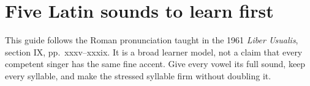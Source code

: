 \newcommand{\PrintServerAnswer}[1]{%
  \begin{serverlessonunit}
  \begin{serverlessonbox}{\ServerTitleData{#1}}
  \small
  {\scriptsize\bfseries YOUR JOB}\quad \ServerJobData{#1}\par
  {\scriptsize\bfseries HEAR}\quad
  \SpokenCue{\ServerCueData{#1}}\par
  {\scriptsize\bfseries RESPONSE}\quad
  {\large\CanonLatin{\SpokenResponse{\ServerLatinData{#1}}}}\par
  {\scriptsize\bfseries LATIN CHUNKS}\quad
  {\footnotesize\ServerLearnerLine{\ServerLearnerData{#1}}}\par
  {\scriptsize\bfseries SAY IT LIKE}\quad
  \SoundLine{\ServerSoundData{#1}}\par
  {\scriptsize\bfseries MEANING}\quad \ServerMeaningData{#1}\par
  \end{serverlessonbox}%
  \end{serverlessonunit}
}

\newenvironment{servervoicetable}{%
  \begingroup
  \small
  \setlength{\LTpre}{0.35em}
  \setlength{\LTpost}{0.8em}
  \renewcommand{\arraystretch}{1.14}
  \begin{longtable}{@{}>{\RaggedRight\arraybackslash}p{0.57\linewidth}>{\centering\arraybackslash}p{0.09\linewidth}>{\RaggedRight\arraybackslash}p{0.28\linewidth}@{}}
  \toprule
  \textbf{What you hear or where you are} & \textbf{Bank} & \textbf{Who answers}\\
  \midrule
  \endfirsthead
  \toprule
  \textbf{What you hear or where you are} & \textbf{Bank} & \textbf{Who answers}\\
  \midrule
  \endhead
  \bottomrule
  \endfoot
}{%
  \end{longtable}
  \endgroup
}

\newcommand{\servervoicerow}[5]{#1 & #2 & \GuideVoiceChoice{#3}{#4}{#5}\\}

\ifCardsOnlyGuide\else
{}\label{course:first}
\section{Five Latin sounds to learn first}

This guide follows the Roman pronunciation taught in the 1961
\emph{Liber Usualis}, section IX, pp.~xxxv--xxxix. It is a broad learner
model, not a claim that every competent singer has the same fine accent. Give
every vowel its full sound, keep every syllable, and make the stressed syllable
firm without doubling it.

